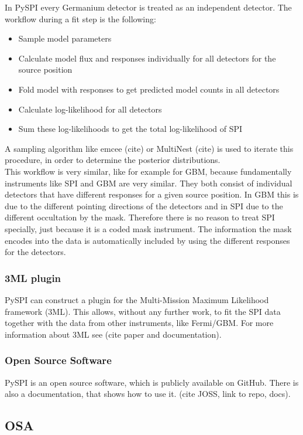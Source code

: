 \documentclass[twocolumn]{aa}
\begin{document}
In PySPI every Germanium detector is treated as an independent detector. The workflow during a fit step is the following:
\begin{itemize}
  \item Sample model parameters
  \item Calculate model flux and responses individually for all detectors for the source position
  \item Fold model with responses to get predicted model counts in all detectors
  \item Calculate log-likelihood for all detectors
  \item Sum these log-likelihoods to get the total log-likelihood of SPI
\end{itemize}
A sampling algorithm like emcee (cite) or MultiNest (cite) is used to iterate this procedure, in order to determine the posterior distributions.\\
This workflow is very similar, like for example for GBM, because fundamentally instruments like SPI and GBM are very similar. They both consist of individual detectors that have different responses for a given source position. In GBM this is due to the different pointing directions of the detectors and in SPI due to the different occultation by the mask. Therefore there is no reason to treat SPI specially, just because it is a coded mask instrument. The information the mask encodes into the data is automatically included by using the different responses for the detectors.

\subsubsection*{3ML plugin}

PySPI can construct a plugin for the Multi-Mission Maximum Likelihood framework (3ML). This allows, without any further work, to fit the SPI data together with the data from other instruments, like Fermi/GBM. For more information about 3ML see (cite paper and documentation).

\subsubsection*{Open Source Software}

PySPI is an open source software, which is publicly available on GitHub. There is also a documentation, that shows how to use it. (cite JOSS, link to repo, docs).

\subsection{OSA}
\label{OSA}
\end{document}
